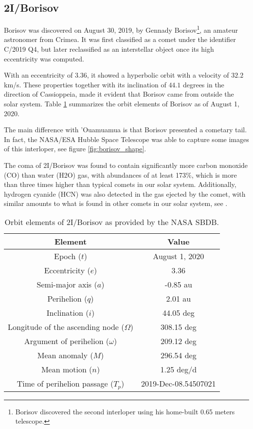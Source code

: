 \subsection{2I/Borisov}

Borisov was discovered on August 30, 2019, by Gennady Borisov\footnote{Borisov
discovered the second interloper using his home-built 0.65 meters
telescope.}, an amateur astronomer from Crimea. It was first classified as
a comet under the identifier C/2019 Q4, but later reclassified as an
interstellar object once its high eccentricity was computed.

With an eccentricity of $3.36$, it showed a hyperbolic orbit with a velocity of
$32.2$ km/s. These properties together with its inclination of $44.1$ degrees in
the direction of Cassioppeia, made it evident that Borisov came from outside the
solar system. Table \ref{tab:borisov_elements} summarizes the orbit elements of
Borisov as of August 1, 2020.

The main difference with 'Ouamuamua is that Borisov presented a cometary tail.
In fact, the NASA/ESA Hubble Space Telescope was able to capture some images of
this interloper, see figure \ref{fig:borisov_shape}.

The coma of 2I/Borisov was found to contain significantly more carbon monoxide
(CO) than water (H2O) gas, with abundances of at least 173\%, which is more than
three times higher than typical comets in our solar system. Additionally,
hydrogen cyanide (HCN) was also detected in the gas ejected by the comet, with
similar amounts to what is found in other comets in our solar system, see
\cite{bodewits2020}.


\begin{table}[H]
  \centering
  \begin{tabular}{|c|c|}
    \hline
    Element & Value \\
    \hline
    Epoch ($t$) & August 1, 2020 \\
    Eccentricity ($e$) & 3.36 \\
    Semi-major axis ($a$) & -0.85 au \\
    Perihelion ($q$) & 2.01 au \\
    Inclination ($i$) & 44.05 deg \\
    Longitude of the ascending node ($\Omega$) & 308.15 deg \\
    Argument of perihelion ($\omega$) & 209.12 deg \\
    Mean anomaly ($M$) & 296.54 deg \\
    Mean motion ($n$) & 1.25 deg/d \\
    Time of perihelion passage ($T_p$) & 2019-Dec-08.54507021 \\
    \hline
  \end{tabular}
  \caption{Orbit elements of 2I/Borisov as provided by the NASA SBDB.}
  \label{tab:borisov_elements}
\end{table}

